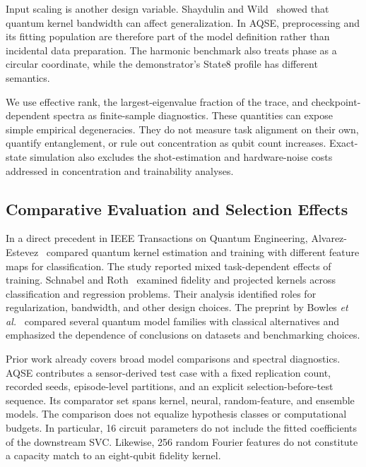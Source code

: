 Input scaling is another design variable. Shaydulin and Wild~\cite{shaydulin2022bandwidth} showed that quantum kernel bandwidth can affect generalization. In AQSE, preprocessing and its fitting population are therefore part of the model definition rather than incidental data preparation. The harmonic benchmark also treats phase as a circular coordinate, while the demonstrator's State8 profile has different semantics.

We use effective rank, the largest-eigenvalue fraction of the trace, and checkpoint-dependent spectra as finite-sample diagnostics. These quantities can expose simple empirical degeneracies. They do not measure task alignment on their own, quantify entanglement, or rule out concentration as qubit count increases. Exact-state simulation also excludes the shot-estimation and hardware-noise costs addressed in concentration and trainability analyses.

\subsection{Comparative Evaluation and Selection Effects}

In a direct precedent in IEEE Transactions on Quantum Engineering, Alvarez-Estevez~\cite{alvarez2025benchmarking} compared quantum kernel estimation and training with different feature maps for classification. The study reported mixed task-dependent effects of training. Schnabel and Roth~\cite{schnabel2025scrutiny} examined fidelity and projected kernels across classification and regression problems. Their analysis identified roles for regularization, bandwidth, and other design choices. The preprint by Bowles \emph{et al.}~\cite{bowles2024benchmarking} compared several quantum model families with classical alternatives and emphasized the dependence of conclusions on datasets and benchmarking choices.

Prior work already covers broad model comparisons and spectral diagnostics. AQSE contributes a sensor-derived test case with a fixed replication count, recorded seeds, episode-level partitions, and an explicit selection-before-test sequence. Its comparator set spans kernel, neural, random-feature, and ensemble models. The comparison does not equalize hypothesis classes or computational budgets. In particular, 16 circuit parameters do not include the fitted coefficients of the downstream SVC. Likewise, 256 random Fourier features do not constitute a capacity match to an eight-qubit fidelity kernel.

